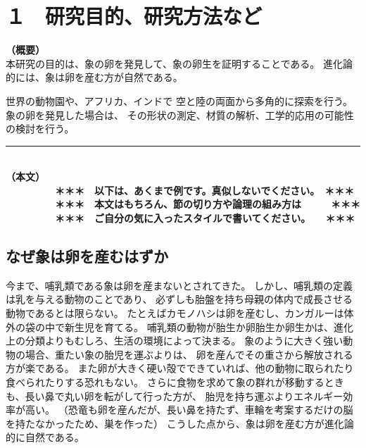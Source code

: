 \documentclass[11pt,a4j,dvipdfmx]{jarticle} 					%
\newcommand{\研究課題名}{象の卵}
\newcommand{\研究機関名}{逢坂大学}
\newcommand{\研究代表者氏名}{湯川秀樹}
\newcommand{\研究期間の最終元号年度}{11}  %
\begin{document}

\section{１　研究目的、研究方法など}

\JSPSInstructions		%
\noindent
\textbf{（概要）}\\
本研究の目的は、象の卵を発見して、象の卵生を証明することである。
進化論的には、象は卵を産む方が自然である。

	世界の動物園や、アフリカ、インドで
	空と陸の両面から多角的に探索を行う。
	象の卵を発見した場合は、
	その形状の測定、材質の解析、工学的応用の可能性の検討を行う。
\vspace*{7zw} %
	

\noindent
\rule{\linewidth}{1pt}\\
\noindent
\textbf{（本文）}
\textbf{\\　　　　　＊＊＊　以下は、あくまで例です。真似しないでください。　＊＊＊\\
　　　　　＊＊＊　本文はもちろん、節の切り方や論理の組み方は　　　＊＊＊\\
　　　　　＊＊＊　ご自分の気に入ったスタイルで書いてください。　　＊＊＊}

\subsection{なぜ象は卵を産むはずか}
今まで、哺乳類である象は卵を産まないとされてきた。
しかし、哺乳類の定義は乳を与える動物のことであり、
必ずしも胎盤を持ち母親の体内で成長させる動物であるとは限らない。
たとえばカモノハシは卵を産むし、カンガルーは体外の袋の中で新生児を育てる。
哺乳類の動物が胎生か卵胎生か卵生かは、進化上の分類よりもむしろ、生活の環境によって決まる。
象のように大きく強い動物の場合、重たい象の胎児を運ぶよりは、
卵を産んでその重さから解放される方が楽である。
また卵が大きく硬い殻でできていれば、他の動物に取られたり食べられたりする恐れもない。
さらに食物を求めて象の群れが移動するときも、長い鼻で丸い卵を転がして行った方が、
胎児を持ち運ぶよりエネルギー効率が高い。
（恐竜も卵を産んだが、長い鼻を持たず、車輪を考案するだけの脳を持たなかったため、巣を作った）
こうした点から、象は卵を産む方が進化論的に自然である。
\end{document}
